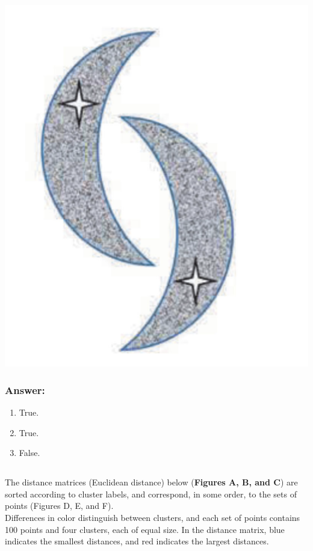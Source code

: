 \documentclass{article}
\begin{document}
\begin{enumerate}[label= (\alph*)]
\begin{center}
        \includegraphics[scale=0.5]{images/Q2P3B.png}
    \end{center}
\end{enumerate}

\subsubsection*{Answer:}

\begin{enumerate}[label= (\alph*)]
    \item True. 
    \item True.
    \item False.
\end{enumerate}

\subsection{}

The distance matrices (Euclidean distance) below (\textbf{Figures A, B, and C}) are sorted according to cluster labels, and correspond, in some order, to the sets of points (Figures D, E, and F).
\\
Differences in color distinguish between clusters, and each set of points contains 100 points and four clusters, each of equal size. In the distance matrix, blue indicates the smallest distances, and red indicates the largest distances.
\end{document}
